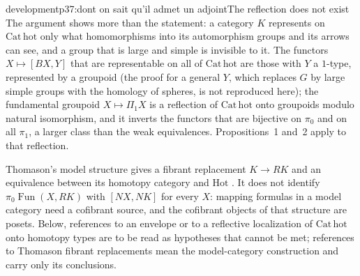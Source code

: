 \begin{dcomment}{development}{p37:dont on sait qu'il admet un adjoint}{The reflection does not exist}
The argument shows more than the statement: a category $K$ represents on $\mathrm{Cat}\,\mathrm{hot}$ only what homomorphisms into its automorphism groups and its arrows can see, and a group that is large and simple is invisible to it. The functors $X\mapsto[BX,Y]$ that are representable on all of $\mathrm{Cat}\,\mathrm{hot}$ are those with $Y$ a $1$-type, represented by a groupoid (the proof for a general $Y$, which replaces $G$ by large simple groups with the homology of spheres, is not reproduced here); the fundamental groupoid $X\mapsto\Pi_1X$ is a reflection of $\mathrm{Cat}\,\mathrm{hot}$ onto groupoids modulo natural isomorphism, and it inverts the functors that are bijective on $\pi_0$ and on all $\pi_1$, a larger class than the weak equivalences. Propositions~1 and~2 apply to that reflection.

Thomason's model structure gives a fibrant replacement $K\to RK$ and an equivalence between its homotopy category and $\mathrm{Hot}$ \citep[Theorem~4.9 and Corollary~5.5]{Thomason1980}. It does not identify $\pi_0\operatorname{Fun}(X,RK)$ with $[NX,NK]$ for every $X$: mapping formulas in a model category need a cofibrant source, and the cofibrant objects of that structure are posets. Below, references to an envelope or to a reflective localization of $\mathrm{Cat}\,\mathrm{hot}$ onto homotopy types are to be read as hypotheses that cannot be met; references to Thomason fibrant replacements mean the model-category construction and carry only its conclusions.
\end{dcomment}


